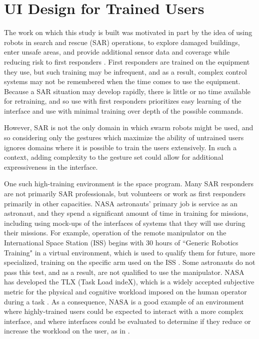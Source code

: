 \chapter{UI Design for Trained Users}
\thispagestyle{fancy}

The work on which this study is built was motivated in part by the idea of using robots in search and rescue (SAR) operations, to explore damaged buildings, enter unsafe areas, and provide additional sensor data and coverage while reducing risk to first responders \citep{micire2010multi}.
First responders are trained on the equipment they use, but such training may be infrequent, and as a result, complex control systems may not be remembered when the time comes to use the equipment. 
Because a SAR situation may develop rapidly, there is little or no time available for retraining, and so use with first responders prioritizes easy learning of the interface and use with minimal training over depth of the possible commands.  

However, SAR is not the only domain in which swarm robots might be used, and so considering only the gestures which maximize the ability of untrained users ignores domains where it is possible to train the users extensively. 
In such a context, adding complexity to the gesture set could allow for additional expressiveness in the interface.

One such high-training environment is the space program. 
Many SAR responders are not primarily SAR professionals, but volunteers or work as first responders primarily in other capacities. 
NASA astronauts' primary job is service as an astronaut, and they spend a significant amount of time in training for missions, including using mock-ups of the interfaces of systems that they will use during their missions. 
For example, operation of the remote manipulator on the International Space Station (ISS) begins with 30 hours of ``Generic Robotics Training" in a virtual environment, which is used to qualify them for future, more specialized, training on the specific arm used on the ISS \citep{liu2013predicting}. 
Some astronauts do not pass this test, and as a result, are not qualified to use the manipulator. 
NASA has developed the TLX (Task Load indeX), which is a widely accepted subjective metric for the physical and cognitive workload imposed on the human operator during a task \citep{hart2006nasa}.
As a consequence, NASA is a good example of an environment where highly-trained users could be expected to interact with a more complex interface, and where interfaces could be evaluated to determine if they reduce or increase the workload on the user, as in \citep{fong2006human}.


